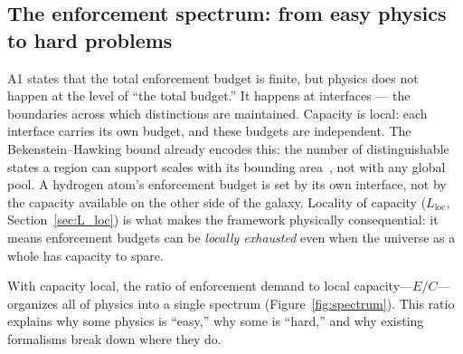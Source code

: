 \documentclass[11pt]{article}
\theoremstyle{remark}
\begin{document}
\subsection{The enforcement spectrum: from easy physics to hard problems}

A1 states that the total enforcement budget is finite, but physics does not happen at the level of ``the total budget.'' It happens at interfaces --- the boundaries across which distinctions are maintained. Capacity is local: each interface carries its own budget, and these budgets are independent.  The Bekenstein--Hawking bound already encodes this: the number of distinguishable states a region can support scales with its bounding area~\cite{Bekenstein1981}, not with any global pool.  A hydrogen atom's enforcement budget is set by its own interface, not by the capacity available on the other side of the galaxy.  Locality of capacity ($L_{\mathrm{loc}}$, Section~\ref{sec:L_loc}) is what makes the framework physically consequential: it means enforcement budgets can be \emph{locally exhausted} even when the universe as a whole has capacity to spare.

With capacity local, the ratio of enforcement demand to local capacity---$E/C$---organizes all of physics into a single spectrum (Figure~\ref{fig:spectrum}).  This ratio explains why some physics is ``easy,'' why some is ``hard,'' and why existing formalisms break down where they do.
\end{document}
